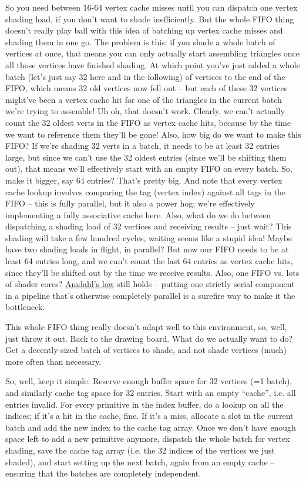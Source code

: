 \documentclass[12pt]{article}
\begin{document}
So you need between 16-64 vertex cache misses until you can dispatch one vertex shading load, if you don’t want to shade inefficiently.
But the whole FIFO thing doesn’t really play ball with this idea of batching up vertex cache misses and shading them in one go.
The problem is this: if you shade a whole batch of vertices at once, that means you can only actually start assembling triangles once all those vertices have finished shading.
At which point you’ve just added a whole batch (let’s just say 32 here and in the following) of vertices to the end of the FIFO, which means 32 old vertices now fell out – but each of these 32 vertices might’ve been a vertex cache hit for one of the triangles in the current batch we’re trying to assemble! Uh oh, that doesn’t work.
Clearly, we can’t actually count the 32 oldest verts in the FIFO as vertex cache hits, because by the time we want to reference them they’ll be gone! Also, how big do we want to make this FIFO? If we’re shading 32 verts in a batch, it needs to be at least 32 entries large, but since we can’t use the 32 oldest entries (since we’ll be shifting them out), that means we’ll effectively start with an empty FIFO on every batch.
So, make it bigger, say 64 entries? That’s pretty big.
And note that every vertex cache lookup involves comparing the tag (vertex index) against all tags in the FIFO – this is fully parallel, but it also a power hog; we’re effectively implementing a fully associative cache here.
Also, what do we do between dispatching a shading load of 32 vertices and receiving results – just wait? This shading will take a few hundred cycles, waiting seems like a stupid idea! Maybe have two shading loads in flight, in parallel? But now our FIFO needs to be at least 64 entries long, and we can’t count the last 64 entries as vertex cache hits, since they’ll be shifted out by the time we receive results.
Also, one FIFO vs.
lots of shader cores? \href{http://en.wikipedia.org/wiki/Amdahl\%27s\_law}{Amdahl’s law} still holds – putting one strictly serial component in a pipeline that’s otherwise completely parallel is a surefire way to make it the bottleneck.

This whole FIFO thing really doesn’t adapt well to this environment, so, well, just throw it out.
Back to the drawing board.
What do we actually want to do? Get a decently-sized batch of vertices to shade, and not shade vertices (much) more often than necessary.

So, well, keep it simple: Reserve enough buffer space for 32 vertices (=1 batch), and similarly cache tag space for 32 entries.
Start with an empty “cache”, i.e. all entries invalid.
For every primitive in the index buffer, do a lookup on all the indices; if it’s a hit in the cache, fine.
If it’s a miss, allocate a slot in the current batch and add the new index to the cache tag array.
Once we don’t have enough space left to add a new primitive anymore, dispatch the whole batch for vertex shading, save the cache tag array (i.e. the 32 indices of the vertices we just shaded), and start setting up the next batch, again from an empty cache – ensuring that the batches are completely independent.
\end{document}
